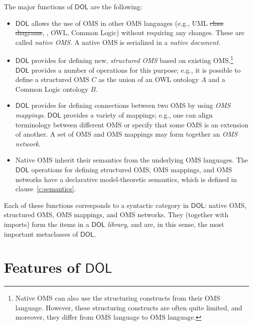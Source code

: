 \documentclass[10pt,fleqn,final]{scrreprt}
\newcommand*{\DOL}{\ensuremath{\mathsf{DOL}}\xspace}
\newcommand{\clauserefname}{clause}
\newcommand{\cref}[1]{\clauserefname~\ref{#1}}
\newenvironment{definitions}[0]{\medskip }{}
\providecommand{\DIFadd}[1]{{\protect\color{blue}\uwave{#1}}} %
\providecommand{\DIFdel}[1]{{\protect\color{red}\sout{#1}}}                      %
\providecommand{\DIFaddbegin}{} %
\providecommand{\DIFaddend}{} %
\providecommand{\DIFdelbegin}{} %
\providecommand{\DIFdelend}{} %
\begin{document}
\begin{definitions}
The major functions of \DOL are the following: 
\begin{itemize}
		\item \DOL allows the use of OMS in other OMS languages (e.g., UML \DIFdelbegin \DIFdel{class diagrams}\DIFdelend \DIFaddbegin \DIFadd{models}\DIFaddend , \CASL, 
		OWL, Common Logic) without requiring any changes. These are called \emph{native OMS}.  A native OMS is serialized in a \emph{native document}.   
		\item \DOL provides for defining new, \emph{structured OMS} based on existing OMS.\footnote{Native OMS can also use the structuring constructs from their OMS language. However, these structuring constructs are often quite limited, and moreover, they differ from OMS language to OMS language.} \DOL provides a number of operations for this purpose; e.g.,
		it is possible to define a structured OMS $C$ as the union of an OWL
		ontology $A$ and a Common Logic ontology $B$.
		\item \DOL provides for defining connections between two OMS by using 
		\emph{OMS mappings}. \DOL provides a variety of mappings; e.g.,  one can align terminology 
		between different OMS or specify that some OMS is an extension of another. A set of OMS
		and OMS mappings may form together an \emph{OMS network}.
		\item Native OMS inherit their semantics from the underlying OMS languages. The \DOL
		 operations for defining structured OMS, 
		OMS mappings, and OMS networks have a declarative model-theoretic semantics, which is 
		 defined in \cref{c:semantics}.  
\end{itemize}

 Each of these functions corresponds to a syntactic category in \DOL: native OMS, structured
 OMS, OMS mappings, and OMS networks. They (together with imports) form the items in a
\emph{\DOL library}, and are, in this sense, the most important metaclasses of \DOL. 


 





\section{Features of \DOL}\label{c:req:overview}


\end{definitions}
\end{document}
